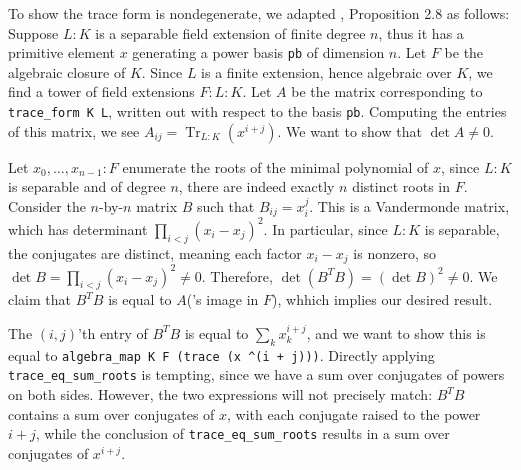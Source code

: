 \documentclass{lipics-v2021}
\newcommand{\lean}[1]{\texttt{#1}\xspace} %
\DeclareMathOperator{\Tr}{\mathrm{Tr}}
\newcommand{\pow}{\textasciicircum\xspace}
\begin{document}
To show the trace form is nondegenerate, we adapted \cite{Neukirch}, Proposition 2.8 as follows:
Suppose $L : K$ is a separable field extension of finite degree $n$,
thus it has a primitive element $x$ generating a power basis \lean{pb} of dimension $n$.
Let $F$ be the algebraic closure of $K$. Since $L$ is a finite extension, hence algebraic over $K$, we find a tower of field extensions $F : L : K$.
Let $A$ be the matrix corresponding to \lean{trace\_form K L}, written out with respect to the basis \lean{pb}.
Computing the entries of this matrix, we see $A_{ij} = \Tr_{L : K} (x^{i + j})$.
We want to show that $\det A \ne 0$.

Let $x_0, \dots, x_{n - 1} : F$ enumerate the roots of the minimal polynomial of $x$,
since $L : K$ is separable and of degree $n$, there are indeed exactly $n$ distinct roots in $F$.
Consider the $n$-by-$n$ matrix $B$ such that $B_{ij} = x_i^j$.
This is a Vandermonde matrix, which has determinant $\prod_{i < j} (x_i - x_j)^2$.
In particular, since $L : K$ is separable, the conjugates are distinct, meaning each factor $x_i - x_j$ is nonzero,
so $\det B = \prod_{i < j} (x_i - x_j)^2 \ne 0$.
Therefore, $\det (B^T B) = (\det B)^2 \ne 0$.
We claim that $B^T B$ is equal to $A$('s image in $F$), whhich implies our desired result.

The $(i, j)$'th entry of $B^T B$ is equal to $\sum_k x_k^{i + j}$,
and we want to show this is equal to \lean{algebra\_map K F (trace (x \pow (i + j)))}.
Directly applying \lean{trace\_eq\_sum\_roots} is tempting, since we have a sum over conjugates of powers on both sides.
However, the two expressions will not precisely match: $B^T B$ contains a sum over conjugates of $x$, with each conjugate raised to the power $i + j$,
while the conclusion of \lean{trace\_eq\_sum\_roots} results in a sum over conjugates of $x^{i + j}$.
\end{document}
